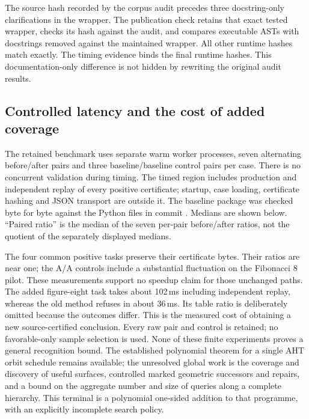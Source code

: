 The source hash recorded by the corpus audit precedes three docstring-only
clarifications in the wrapper.  The publication check retains that exact
tested wrapper, checks its hash against the audit, and compares executable
ASTs with docstrings removed against the maintained wrapper.  All other
runtime hashes match exactly.  The timing evidence binds the final runtime
hashes.  This documentation-only difference is not hidden by rewriting the
original audit results.

\subsection{Controlled latency and the cost of added coverage}

The retained benchmark uses separate warm worker processes, seven alternating
before/after pairs and three baseline/baseline control pairs per case.
There is no concurrent validation during timing.  The timed region includes
production and independent replay of every positive certificate; startup,
case loading, certificate hashing and JSON transport are outside it.
The baseline package was checked byte for byte against the Python files
in commit .  Medians are shown below.  ``Paired ratio'' is
the median of the seven per-pair before/after ratios, not the quotient of
the separately displayed medians.



The four common positive tasks preserve their certificate bytes.  Their
ratios are near one; the A/A controls include a substantial fluctuation
on the Fibonacci 8 pilot.  These measurements support no speedup claim
for those unchanged paths.  The added figure-eight task takes about
102\,ms including independent replay, whereas the old method refuses in
about 36\,ms.  Its table ratio is deliberately omitted because the
outcomes differ.  This is the measured cost of obtaining a new
source-certified conclusion.  Every raw pair and control is retained;
no favorable-only sample selection is used.  None of these finite experiments proves a general
recognition bound.  The established polynomial theorem for a single
AHT orbit schedule remains available; the unresolved global work is the
coverage and discovery of useful surfaces, controlled marked geometric
successors and repairs, and a bound on the aggregate number and size of
queries along a complete hierarchy.  This terminal is a polynomial
one-sided addition to that programme, with an explicitly incomplete
search policy.
